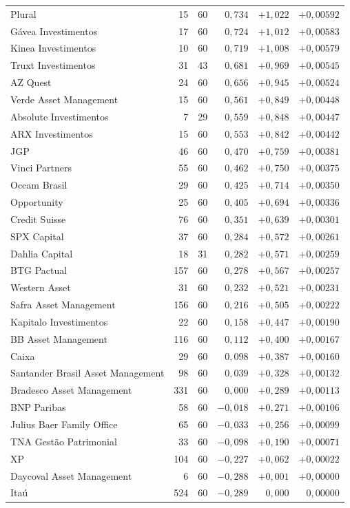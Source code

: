 \documentclass[11pt,a4paper]{article}
\begin{document}
\begin{center}
\begin{longtable}{@{}lrrrrr@{}}
Plural & 15 & 60 & $0{,}734$ & $+1{,}022$ & $+0{,}00592$ \\
Gávea Investimentos & 17 & 60 & $0{,}724$ & $+1{,}012$ & $+0{,}00583$ \\
Kinea Investimentos & 10 & 60 & $0{,}719$ & $+1{,}008$ & $+0{,}00579$ \\
Truxt Investimentos & 31 & 43 & $0{,}681$ & $+0{,}969$ & $+0{,}00545$ \\
AZ Quest & 24 & 60 & $0{,}656$ & $+0{,}945$ & $+0{,}00524$ \\
Verde Asset Management & 15 & 60 & $0{,}561$ & $+0{,}849$ & $+0{,}00448$ \\
Absolute Investimentos & 7 & 29 & $0{,}559$ & $+0{,}848$ & $+0{,}00447$ \\
ARX Investimentos & 15 & 60 & $0{,}553$ & $+0{,}842$ & $+0{,}00442$ \\
JGP & 46 & 60 & $0{,}470$ & $+0{,}759$ & $+0{,}00381$ \\
Vinci Partners & 55 & 60 & $0{,}462$ & $+0{,}750$ & $+0{,}00375$ \\
Occam Brasil & 29 & 60 & $0{,}425$ & $+0{,}714$ & $+0{,}00350$ \\
Opportunity & 25 & 60 & $0{,}405$ & $+0{,}694$ & $+0{,}00336$ \\
Credit Suisse & 76 & 60 & $0{,}351$ & $+0{,}639$ & $+0{,}00301$ \\
SPX Capital & 37 & 60 & $0{,}284$ & $+0{,}572$ & $+0{,}00261$ \\
Dahlia Capital & 18 & 31 & $0{,}282$ & $+0{,}571$ & $+0{,}00259$ \\
BTG Pactual & 157 & 60 & $0{,}278$ & $+0{,}567$ & $+0{,}00257$ \\
Western Asset & 31 & 60 & $0{,}232$ & $+0{,}521$ & $+0{,}00231$ \\
Safra Asset Management & 156 & 60 & $0{,}216$ & $+0{,}505$ & $+0{,}00222$ \\
Kapitalo Investimentos & 22 & 60 & $0{,}158$ & $+0{,}447$ & $+0{,}00190$ \\
BB Asset Management & 116 & 60 & $0{,}112$ & $+0{,}400$ & $+0{,}00167$ \\
Caixa & 29 & 60 & $0{,}098$ & $+0{,}387$ & $+0{,}00160$ \\
Santander Brasil Asset Management & 98 & 60 & $0{,}039$ & $+0{,}328$ & $+0{,}00132$ \\
Bradesco Asset Management & 331 & 60 & $0{,}000$ & $+0{,}289$ & $+0{,}00113$ \\
BNP Paribas & 58 & 60 & $-0{,}018$ & $+0{,}271$ & $+0{,}00106$ \\
Julius Baer Family Office & 65 & 60 & $-0{,}033$ & $+0{,}256$ & $+0{,}00099$ \\
TNA Gestão Patrimonial & 33 & 60 & $-0{,}098$ & $+0{,}190$ & $+0{,}00071$ \\
XP & 104 & 60 & $-0{,}227$ & $+0{,}062$ & $+0{,}00022$ \\
Daycoval Asset Management & 6 & 60 & $-0{,}288$ & $+0{,}001$ & $+0{,}00000$ \\
Itaú & 524 & 60 & $-0{,}289$ & $0{,}000$ & $0{,}00000$ \\
\end{longtable}
\end{center}
\end{document}

